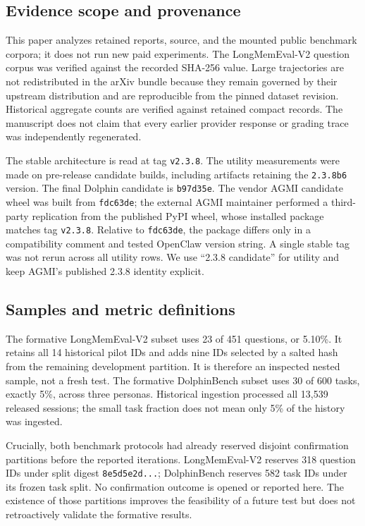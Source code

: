 \documentclass[10pt,twocolumn]{article}
\newcommand{\code}[1]{\texttt{\small #1}}
\begin{document}
\subsection{Evidence scope and provenance}
This paper analyzes retained reports, source, and the mounted public benchmark corpora; it does not run new paid experiments. The LongMemEval-V2 question corpus was verified against the recorded SHA-256 value. Large trajectories are not redistributed in the arXiv bundle because they remain governed by their upstream distribution and are reproducible from the pinned dataset revision. Historical aggregate counts are verified against retained compact records. The manuscript does not claim that every earlier provider response or grading trace was independently regenerated.

The stable architecture is read at tag \code{v2.3.8}. The utility measurements were made on pre-release candidate builds, including artifacts retaining the \code{2.3.8b6} version. The final Dolphin candidate is \code{b97d35e}. The vendor AGMI candidate wheel was built from \code{fdc63de}; the external AGMI maintainer performed a third-party replication from the published PyPI wheel, whose installed package matches tag \code{v2.3.8}. Relative to \code{fdc63de}, the package differs only in a compatibility comment and tested OpenClaw version string. A single stable tag was not rerun across all utility rows. We use ``2.3.8 candidate'' for utility and keep AGMI's published 2.3.8 identity explicit.

\subsection{Samples and metric definitions}
The formative LongMemEval-V2 subset uses 23 of 451 questions, or 5.10\%. It retains all 14 historical pilot IDs and adds nine IDs selected by a salted hash from the remaining development partition. It is therefore an inspected nested sample, not a fresh test. The formative DolphinBench subset uses 30 of 600 tasks, exactly 5\%, across three personas. Historical ingestion processed all 13,539 released sessions; the small task fraction does not mean only 5\% of the history was ingested.

Crucially, both benchmark protocols had already reserved disjoint confirmation partitions before the reported iterations. LongMemEval-V2 reserves 318 question IDs under split digest \code{8e5d5e2d...}; DolphinBench reserves 582 task IDs under its frozen task split. No confirmation outcome is opened or reported here. The existence of those partitions improves the feasibility of a future test but does not retroactively validate the formative results.
\end{document}
